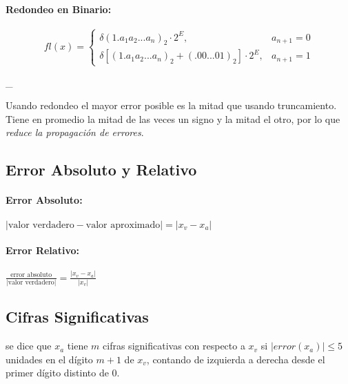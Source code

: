 \hypertarget{redondeo-en-binario}{%
\paragraph{Redondeo en Binario:}\label{redondeo-en-binario}}

\[
fl(x)=
\begin{cases}
\delta(1 . a_1 a_2 ... a_n)_2 \cdot 2^E, & a_{n+1} = 0\\ 
\delta [(1 . a_1 a_2 ... a_n)_2 + (.0 0 ... 0 1)_2 ] \cdot 2^E, & a_{n+1} = 1 
\end{cases}
\]

\_

Usando redondeo el mayor error posible es la mitad que usando
truncamiento. Tiene en promedio la mitad de las veces un signo y la
mitad el otro, por lo que \emph{reduce la propagación de errores}.

\hypertarget{error-absoluto-y-relativo}{%
\subsection{Error Absoluto y Relativo}\label{error-absoluto-y-relativo}}

\hypertarget{error-absoluto}{%
\paragraph{Error Absoluto:}\label{error-absoluto}}

\(|\text{valor verdadero} - \text{valor aproximado}| = |x_v - x_a|\)

\hypertarget{error-relativo}{%
\paragraph{Error Relativo:}\label{error-relativo}}

\(\frac{\text{error absoluto}}{|\text{valor verdadero|}} = \frac{|x_v - x_a|}{|x_v|}\)

\hypertarget{cifras-significativas}{%
\subsection{Cifras Significativas}\label{cifras-significativas}}

\Definicion se dice que \(x_a\) tiene \(m\) cifras significativas con
respecto a \(x_v\) si \(|error(x_a)| \leq 5\) unidades en el dígito
\(m+1\) de \(x_v\), contando de izquierda a derecha desde el primer
dígito distinto de 0.

